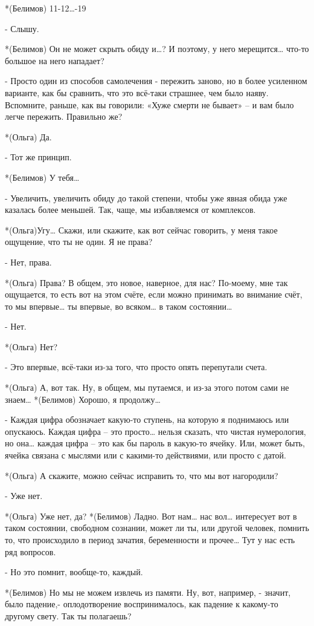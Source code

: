 *(Белимов) 11-12…-19

- Слышу.

*(Белимов) Он не может скрыть обиду и…? И поэтому, у него мерещится… что-то большое на него нападает?

- Просто один из способов самолечения - пережить заново, но в более усиленном варианте, как бы сравнить, что это всё-таки страшнее, чем было наяву. Вспомните, раньше, как вы говорили: «Хуже смерти не бывает» – и вам было легче пережить. Правильно же?

*(Ольга) Да.

- Тот же принцип.

*(Белимов) У тебя…

- Увеличить, увеличить обиду до такой степени, чтобы уже явная обида уже казалась более меньшей. Так, чаще, мы избавляемся от комплексов.

*(Ольга)Угу… Скажи, или скажите, как вот сейчас говорить, у меня такое ощущение, что ты не один. Я не права?

- Нет, права.

*(Ольга) Права? В общем, это новое, наверное, для нас? По-моему, мне так ощущается, то есть вот на этом счёте, если можно принимать во внимание счёт, то мы впервые… ты впервые, во всяком… в таком состоянии…

- Нет.

*(Ольга) Нет?

- Это впервые, всё-таки из-за того, что просто опять перепутали счета.

*(Ольга) А, вот так. Ну, в общем, мы путаемся, и из-за этого потом сами не знаем…
*(Белимов) Хорошо, я продолжу…

- Каждая цифра обозначает какую-то ступень, на которую я поднимаюсь или опускаюсь. Каждая цифра – это просто… нельзя сказать, что чистая нумерология, но она… каждая цифра – это как бы пароль в какую-то ячейку. Или, может быть, ячейка связана с мыслями или с какими-то действиями, или просто с датой.

*(Ольга) А скажите, можно сейчас исправить то, что мы вот нагородили?

- Уже нет.

*(Ольга) Уже нет, да?
*(Белимов) Ладно. Вот нам… нас вол… интересует вот в таком состоянии, свободном сознании, может ли ты, или другой человек, помнить то, что происходило в период зачатия, беременности и прочее… Тут у нас есть ряд вопросов.

- Но это помнит, вообще-то, каждый.

*(Белимов) Но мы не можем извлечь из памяти. Ну, вот, например, - значит, было падение,- оплодотворение воспринималось, как падение к какому-то другому свету. Так ты полагаешь?

